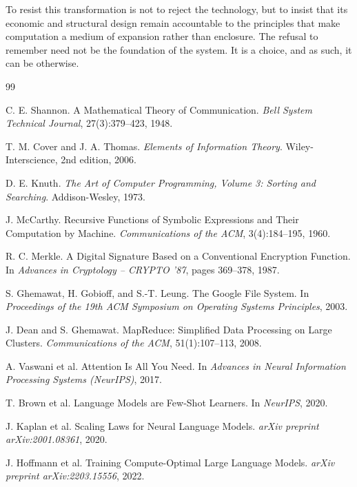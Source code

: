 \documentclass[12pt, oneside]{article}
\begin{document}
To resist this transformation is not to reject the technology, but to insist that its economic and structural design remain accountable to the principles that make computation a medium of expansion rather than enclosure. The refusal to remember need not be the foundation of the system. It is a choice, and as such, it can be otherwise.

\newpage
\begin{thebibliography}{99}

C. E. Shannon.
\newblock A Mathematical Theory of Communication.
\newblock \emph{Bell System Technical Journal}, 27(3):379--423, 1948.

T. M. Cover and J. A. Thomas.
\newblock \emph{Elements of Information Theory}.
\newblock Wiley-Interscience, 2nd edition, 2006.

D. E. Knuth.
\newblock \emph{The Art of Computer Programming, Volume 3: Sorting and Searching}.
\newblock Addison-Wesley, 1973.

J. McCarthy.
\newblock Recursive Functions of Symbolic Expressions and Their Computation by Machine.
\newblock \emph{Communications of the ACM}, 3(4):184--195, 1960.

R. C. Merkle.
\newblock A Digital Signature Based on a Conventional Encryption Function.
\newblock In \emph{Advances in Cryptology -- CRYPTO '87}, pages 369--378, 1987.

S. Ghemawat, H. Gobioff, and S.-T. Leung.
\newblock The Google File System.
\newblock In \emph{Proceedings of the 19th ACM Symposium on Operating Systems Principles}, 2003.

J. Dean and S. Ghemawat.
\newblock MapReduce: Simplified Data Processing on Large Clusters.
\newblock \emph{Communications of the ACM}, 51(1):107--113, 2008.

A. Vaswani et al.
\newblock Attention Is All You Need.
\newblock In \emph{Advances in Neural Information Processing Systems (NeurIPS)}, 2017.

T. Brown et al.
\newblock Language Models are Few-Shot Learners.
\newblock In \emph{NeurIPS}, 2020.

J. Kaplan et al.
\newblock Scaling Laws for Neural Language Models.
\newblock \emph{arXiv preprint arXiv:2001.08361}, 2020.

J. Hoffmann et al.
\newblock Training Compute-Optimal Large Language Models.
\newblock \emph{arXiv preprint arXiv:2203.15556}, 2022.


\end{thebibliography}
\end{document}
